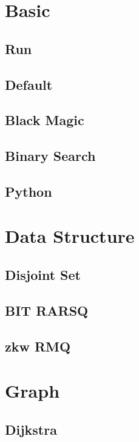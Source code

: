 \section{Basic}
    \subsection{Run}
        
    \subsection{Default}
        
    \subsection{Black Magic}
        
    \subsection{Binary Search}
        
    \subsection{Python}
        

\section{Data Structure}
    \subsection{Disjoint Set}
        
    \subsection{BIT RARSQ}
        
    \subsection{zkw RMQ}
        

\section{Graph}
    \subsection{Dijkstra}
        
